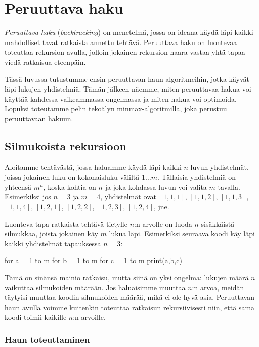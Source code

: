 \chapter{Peruuttava haku}

\emph{Peruuttava haku} (\emph{backtracking}) on menetelmä,
jossa on ideana käydä läpi kaikki mahdolliset tavat 
ratkaista annettu tehtävä.
Peruuttava haku on luontevaa toteuttaa rekursion avulla,
jolloin jokainen rekursion haara vastaa yhtä tapaa
viedä ratkaisua eteenpäin.

Tässä luvussa tutustumme ensin peruuttavan haun algoritmeihin,
jotka käyvät läpi lukujen yhdistelmiä.
Tämän jälkeen näemme, miten peruuttavaa hakua voi käyttää
kahdessa vaikeammassa ongelmassa ja miten hakua voi optimoida.
Lopuksi toteutamme pelin tekoälyn minmax-algoritmilla,
joka perustuu peruuttavaan hakuun.

\section{Silmukoista rekursioon}

Aloitamme tehtävästä,
jossa haluamme käydä läpi kaikki $n$ luvun yhdistelmät,
joissa jokainen luku on kokonaisluku väliltä $1 \dots m$.
Tällaisia yhdistelmiä on yhteensä $m^n$,
koska kohtia on $n$ ja joka kohdassa luvun voi valita $m$ tavalla.
Esimerkiksi jos $n=3$ ja $m=4$, yhdistelmät ovat
$[1,1,1]$, $[1,1,2]$, $[1,1,3]$, $[1,1,4]$, $[1,2,1]$,
$[1,2,2]$, $[1,2,3]$, $[1,2,4]$, jne.

Luonteva tapa ratkaista tehtävä tietylle $n$:n arvolle on
luoda $n$ sisäkkäistä silmukkaa, joista jokainen käy $m$ lukua läpi.
Esimerkiksi seuraava koodi käy läpi kaikki yhdistelmät
tapauksessa $n=3$:

\begin{code}
for a = 1 to m
    for b = 1 to m
        for c = 1 to m
            print(a,b,c)
\end{code}

Tämä on sinänsä mainio ratkaisu, mutta siinä on yksi ongelma:
lukujen määrä $n$ vaikuttaa silmukoiden määrään.
Jos haluaisimme muuttaa $n$:n arvoa, meidän täytyisi muuttaa
koodin silmukoiden määrää, mikä ei ole hyvä asia.
Peruuttavan haun avulla voimme kuitenkin toteuttaa ratkaisun
rekursiivisesti niin, että sama koodi toimii kaikille $n$:n arvoille.

\subsection{Haun toteuttaminen}

